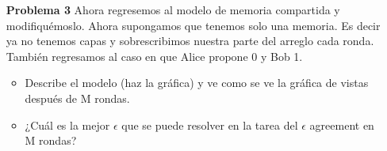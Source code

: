 \documentclass{article}
\begin{document}
\begin{enumerate}
\item[\bf{Problema 3}] Ahora regresemos al modelo de memoria compartida y modifiquémoslo. Ahora supongamos que tenemos solo una memoria. Es decir ya no tenemos capas y sobrescribimos nuestra parte del arreglo cada ronda. También regresamos al caso en que Alice propone 0 y Bob 1.
\begin{itemize}
\item Describe el modelo (haz la gráfica) y ve como se ve la gráfica de vistas después de M rondas.
\item ¿Cuál es la mejor $\epsilon$ que se puede resolver en la tarea del $\epsilon$ agreement en M rondas?
\end{itemize}


\end{enumerate}
\end{document}
